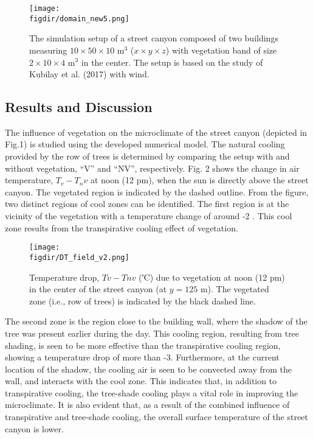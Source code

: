 	\begin{figure}[t]
	\centering
	\texttt{[image: \\figdir/domain\_new5.png]}
	\caption{The simulation setup of a street canyon composed of two buildings measuring $10 \times 50 \times 10$ m$^3$ ($x\times y \times z$) with vegetation band of size $2 \times 10 \times 4$ m$^3$ in the center. The setup is based on the study of Kubilay et al. (2017) with wind.}
	\label{fig:domain_new5}
	\end{figure}

\subsection{Results and Discussion}

The influence of vegetation on the microclimate of the street canyon (depicted in Fig.1) is studied using the developed numerical model. The natural cooling provided by the row of trees is determined by comparing the setup with and without vegetation, “V” and “NV”, respectively. Fig. 2 shows the change in air temperature, $T_v-T_nv$ at noon (12 pm), when the sun is directly above the street canyon. The vegetated region is indicated by the dashed outline. From the figure, two distinct regions of cool zones can be identified. The first region is at the vicinity of the vegetation with a temperature change of around -2 . This cool zone results from the transpirative cooling effect of vegetation. 

	\begin{figure}[t]
	\centering
	\texttt{[image: \\figdir/DT\_field\_v2.png]}
	\caption{Temperature drop, $Tv - Tnv$ (℃) due to vegetation at noon (12 pm) in the center of the street canyon (at $y= 125$ m). The vegetated zone (i.e., row of trees) is indicated by the black dashed line.}
	\label{fig:DT_field_v2}
\end{figure}


The second zone is the region close to the building wall, where the shadow of the tree was present earlier during the day. This cooling region, resulting from tree shading, is seen to be more effective than the transpirative cooling region, showing a temperature drop of more than -3. Furthermore, at the current location of the shadow, the cooling air is seen to be convected away from the wall, and interacts with the cool zone. This indicates that, in addition to transpirative cooling, the tree-shade cooling plays a vital role in improving the microclimate. It is also evident that, as a result of the combined influence of transpirative and tree-shade cooling, the overall surface temperature of the street canyon is lower.

